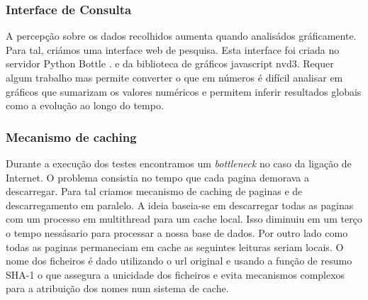 \subsubsection{Interface de Consulta}
\hspace{15pt}A percepção sobre os dados recolhidos aumenta quando analisádos gráficamente. Para tal, criámos uma interface web de pesquisa. Esta interface foi criada no servidor Python Bottle \cite{bottle}. 
e da biblioteca de gráficos javascript nvd3. Requer algum trabalho mas permite 
converter o que em números é difícil analisar em gráficos que sumarizam os 
valores numéricos e permitem inferir resultados globais como a evolução ao longo 
do tempo.

\subsubsection{Mecanismo de caching}
\hspace{15pt}Durante a execução dos testes encontramos um \textit{bottleneck} no caso da ligação de Internet. O problema consistia no tempo que cada pagina demorava a descarregar. Para tal criamos mecanismo de caching de paginas e de descarregamento em paralelo. A ideia baseia-se em descarregar todas as paginas com um processo em multithread para um cache local. Isso diminuiu em um terço o tempo nessásario para processar a nossa base de dados. Por outro lado como todas as paginas permaneciam em cache as seguintes leituras seriam locais. O nome dos ficheiros é dado utilizando o url original e usando a função de resumo SHA-1 o que assegura a unicidade dos ficheiros e evita mecanismos complexos para a atribuição dos nomes num sistema de cache.

